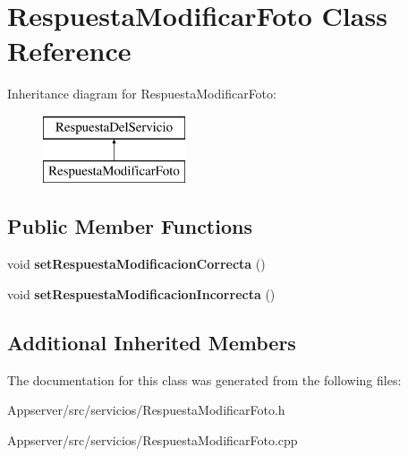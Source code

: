\hypertarget{classRespuestaModificarFoto}{}\section{Respuesta\+Modificar\+Foto Class Reference}
\label{classRespuestaModificarFoto}
Inheritance diagram for Respuesta\+Modificar\+Foto\+:\begin{figure}[H]
\begin{center}
\leavevmode
\includegraphics[height=2.000000cm]{classRespuestaModificarFoto}
\end{center}
\end{figure}
\subsection*{Public Member Functions}
\begin{DoxyCompactItemize}
\item 
void {\bfseries set\+Respuesta\+Modificacion\+Correcta} ()\hypertarget{classRespuestaModificarFoto_a59021878e7bc6c7856fe33ab91941b6b}{}\label{classRespuestaModificarFoto_a59021878e7bc6c7856fe33ab91941b6b}

\item 
void {\bfseries set\+Respuesta\+Modificacion\+Incorrecta} ()\hypertarget{classRespuestaModificarFoto_a3b3c562f9eedd98b8980e107bbf5488b}{}\label{classRespuestaModificarFoto_a3b3c562f9eedd98b8980e107bbf5488b}

\end{DoxyCompactItemize}
\subsection*{Additional Inherited Members}


The documentation for this class was generated from the following files\+:\begin{DoxyCompactItemize}
\item 
Appserver/src/servicios/Respuesta\+Modificar\+Foto.\+h\item 
Appserver/src/servicios/Respuesta\+Modificar\+Foto.\+cpp\end{DoxyCompactItemize}
